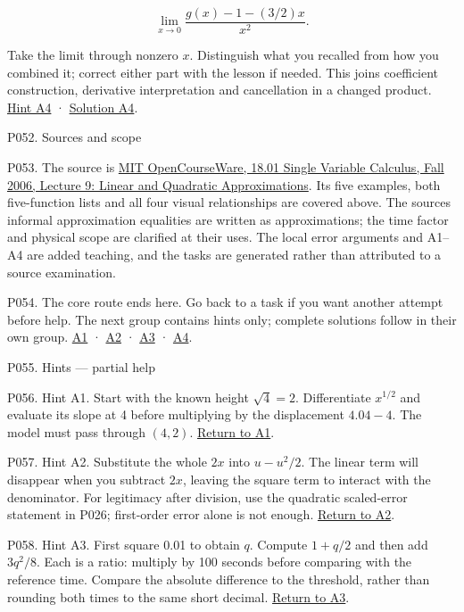 \documentclass[
  11pt,
]{article}
\begin{document}
\[
\lim_{x\to0}\frac{g(x)-1-(3/2)x}{x^2}.
\]

Take the limit through nonzero \(x\). Distinguish what you recalled from
how you combined it; correct either part with the lesson if needed. This
joins coefficient construction, derivative interpretation and
cancellation in a changed product. \protect\hyperlink{h4}{Hint A4} ·
\protect\hyperlink{s4}{Solution A4}.

P052. Sources and scope

P053. The source is
\href{https://ocw.mit.edu/courses/18-01-single-variable-calculus-fall-2006/40cb41807e6d67373f3299ce87c4d9b3_lec9.pdf}{MIT
OpenCourseWare, 18.01 Single Variable Calculus, Fall 2006, Lecture 9:
Linear and Quadratic Approximations}. Its five examples, both
five-function lists and all four visual relationships are covered above.
The source\textquotesingle s informal approximation equalities are
written as approximations; the time factor and physical scope are
clarified at their uses. The local error arguments and A1--A4 are added
teaching, and the tasks are generated rather than attributed to a source
examination.

P054. The core route ends here. Go back to a task if you want another
attempt before help. The next group contains hints only; complete
solutions follow in their own group. \protect\hyperlink{a1}{A1} ·
\protect\hyperlink{a2}{A2} · \protect\hyperlink{a3}{A3} ·
\protect\hyperlink{a4}{A4}.

P055. Hints --- partial help

P056. Hint A1. Start with the known height \(\sqrt4=2\). Differentiate
\(x^{1/2}\) and evaluate its slope at 4 before multiplying by the
displacement \(4.04-4\). The model must pass through \((4,2)\).
\protect\hyperlink{a1}{Return to A1}.

P057. Hint A2. Substitute the whole \(2x\) into \(u-u^2/2\). The linear
term will disappear when you subtract \(2x\), leaving the square term to
interact with the denominator. For legitimacy after division, use the
quadratic scaled-error statement in P026; first-order error alone is not
enough. \protect\hyperlink{a2}{Return to A2}.

P058. Hint A3. First square 0.01 to obtain \(q\). Compute \(1+q/2\) and
then add \(3q^2/8\). Each is a ratio: multiply by 100 seconds before
comparing with the reference time. Compare the absolute difference to
the threshold, rather than rounding both times to the same short
decimal. \protect\hyperlink{a3}{Return to A3}.
\end{document}

